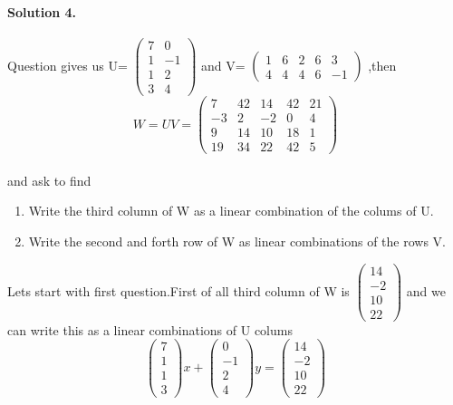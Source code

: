 \documentclass[11pt]{article}
\begin{document}
\paragraph{Solution 4.}Question gives us U=
$
\begin{pmatrix}
7&0\\
1&-1\\
1&2\\
3&4
\end{pmatrix}
$
and V=
$
\begin{pmatrix}
1 & 6 & 2 & 6 & 3\\
4 & 4 & 4 & 6 & -1
\end{pmatrix}
$
,then 
\[
W=UV=
\begin{pmatrix}
7 & 42 & 14 & 42 & 21\\
-3 & 2 & -2 & 0 & 4\\
9 & 14 & 10 & 18 & 1\\
19 & 34 & 22 & 42 & 5
\end{pmatrix}
\]
\paragraph{}and ask to find 
\begin{enumerate}
\item Write the third column of W as a linear combination of the colums of U.
\item Write the second and forth row of W as linear combinations of the rows V.
\end{enumerate}
Lets start with first question.First of all third column of W is
$
\begin{pmatrix}
14\\
-2\\
10\\
22
\end{pmatrix}
$
and we can write this as a linear combinations of U colums
\[
\begin{pmatrix}
7\\
1\\
1\\
3
\end{pmatrix}x
+
\begin{pmatrix}
0\\
-1\\
2\\
4
\end{pmatrix}y
=
\begin{pmatrix}
14\\
-2\\
10\\
22
\end{pmatrix}
\]
\end{document}
